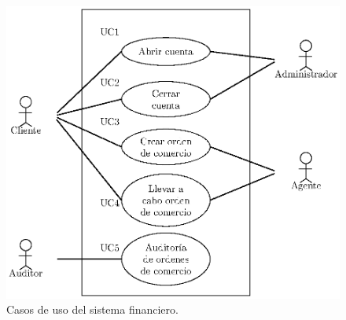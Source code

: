 \begin{figure}[h!]
  \centering
    \includegraphics[scale=0.6]{Imagenes/diag_useCase_financialSystem_esp.eps}
    \caption{Casos de uso del sistema financiero.}
    \label{useCases_ex}
\end{figure}



